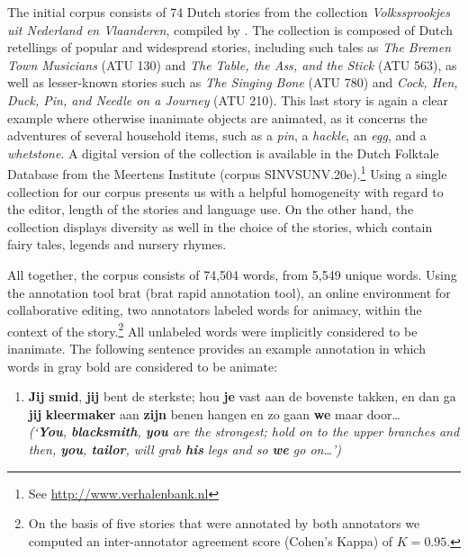 The initial corpus consists of 74 Dutch stories from the collection \textit{Volkssprookjes uit Nederland en Vlaanderen}, compiled by \citeauthor{sinninghe:1978}.\autocite{sinninghe:1978} The collection is composed of Dutch retellings of popular and widespread stories, including such tales as \textit{The Bremen Town Musicians} (ATU 130)\autocite[The ATU numbers refer to the classificatory system for folklore tales, as designed by][]{uther:2004} and \textit{The Table, the Ass, and the Stick } (ATU 563), as well as lesser-known stories such as \textit{The Singing Bone} (ATU 780) and \textit{Cock, Hen, Duck, Pin, and Needle on a Journey} (ATU 210). This last story is again a clear example where otherwise inanimate objects are animated, as it concerns the adventures of several household items, such as a \textit{pin}, a \textit{hackle}, an \textit{egg}, and a \textit{whetstone}. A digital version of the collection is available in the Dutch Folktale Database from the Meertens Institute (corpus SINVSUNV.20e).\footnote{See \url{http://www.verhalenbank.nl}} Using a single collection for our corpus presents us with a helpful homogeneity with regard to the editor, length of the stories and language  use. On the other hand, the collection displays diversity as well in the choice of the stories, which contain fairy tales, legends and nursery rhymes.

All together, the corpus consists of 74,504 words, from 5,549 unique words. Using the annotation tool brat (brat rapid annotation tool), an online environment for collaborative editing\autocite[Available from: \texttt{http://brat.nlplab.org}, see][]{stenetorp:2012}, two annotators labeled words for animacy, within the context of the story.\footnote{On the basis of five stories that were annotated by both annotators we computed an inter-annotator agreement score (Cohen's Kappa) of $K=0.95$.} All unlabeled words were implicitly considered to be inanimate. The following sentence provides an example annotation in which words in gray bold are considered to be animate:

\begin{enumerate}
\item \textbf{Jij} \textbf{smid}, \textbf{jij} bent de sterkste; hou \textbf{je} vast aan de bovenste
takken, en dan ga \textbf{jij} \textbf{kleermaker} aan \textbf{zijn} benen hangen en zo gaan \textbf{we} maar door\ldots\\
\emph{(`\textbf{You}, \textbf{blacksmith}, \textbf{you} are the strongest; hold on to the upper
branches and then, \textbf{you}, \textbf{tailor}, will grab \textbf{his} legs and so \textbf{we} go on\ldots')}
\end{enumerate}

